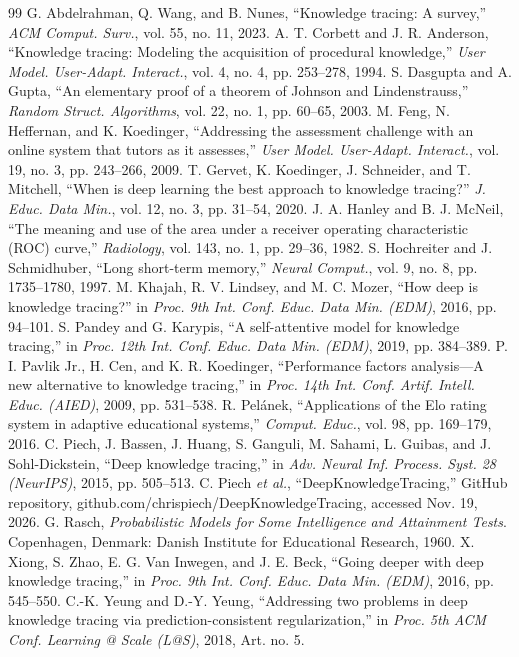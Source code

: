 \documentclass[10pt,twocolumn]{article}
\begin{document}
\renewcommand{\refname}{\normalsize\centering\bfseries АШИГЛАСАН МАТЕРИАЛ, НОМ ЗҮЙ}
\begin{thebibliography}{99}\footnotesize
\setlength{\itemsep}{1pt}
 G. Abdelrahman, Q. Wang, and B. Nunes, “Knowledge tracing: A survey,”
\emph{ACM Comput. Surv.}, vol. 55, no. 11, 2023.
 A. T. Corbett and J. R. Anderson, “Knowledge tracing: Modeling the acquisition of
procedural knowledge,” \emph{User Model. User-Adapt. Interact.}, vol. 4, no. 4, pp. 253--278, 1994.
 S. Dasgupta and A. Gupta, “An elementary proof of a theorem of Johnson and
Lindenstrauss,” \emph{Random Struct. Algorithms}, vol. 22, no. 1, pp. 60--65, 2003.
 M. Feng, N. Heffernan, and K. Koedinger, “Addressing the assessment challenge with
an online system that tutors as it assesses,” \emph{User Model. User-Adapt. Interact.}, vol. 19,
no. 3, pp. 243--266, 2009.
 T. Gervet, K. Koedinger, J. Schneider, and T. Mitchell, “When is deep learning the
best approach to knowledge tracing?” \emph{J. Educ. Data Min.}, vol. 12, no. 3, pp. 31--54, 2020.
 J. A. Hanley and B. J. McNeil, “The meaning and use of the area under a receiver
operating characteristic (ROC) curve,” \emph{Radiology}, vol. 143, no. 1, pp. 29--36, 1982.
 S. Hochreiter and J. Schmidhuber, “Long short-term memory,” \emph{Neural Comput.},
vol. 9, no. 8, pp. 1735--1780, 1997.
 M. Khajah, R. V. Lindsey, and M. C. Mozer, “How deep is knowledge tracing?” in
\emph{Proc. 9th Int. Conf. Educ. Data Min. (EDM)}, 2016, pp. 94--101.
 S. Pandey and G. Karypis, “A self-attentive model for knowledge tracing,” in
\emph{Proc. 12th Int. Conf. Educ. Data Min. (EDM)}, 2019, pp. 384--389.
 P. I. Pavlik Jr., H. Cen, and K. R. Koedinger, “Performance factors analysis---A new
alternative to knowledge tracing,” in \emph{Proc. 14th Int. Conf. Artif. Intell. Educ. (AIED)},
2009, pp. 531--538.
 R. Pelánek, “Applications of the Elo rating system in adaptive educational
systems,” \emph{Comput. Educ.}, vol. 98, pp. 169--179, 2016.
 C. Piech, J. Bassen, J. Huang, S. Ganguli, M. Sahami, L. Guibas, and
J. Sohl-Dickstein, “Deep knowledge tracing,” in \emph{Adv. Neural Inf. Process. Syst. 28
(NeurIPS)}, 2015, pp. 505--513.
 C. Piech \emph{et al.}, “DeepKnowledgeTracing,” GitHub repository,
github.com/chrispiech/DeepKnowledgeTracing, accessed Nov. 19, 2026.
 G. Rasch, \emph{Probabilistic Models for Some Intelligence and Attainment Tests}.
Copenhagen, Denmark: Danish Institute for Educational Research, 1960.
 X. Xiong, S. Zhao, E. G. Van Inwegen, and J. E. Beck, “Going deeper with deep
knowledge tracing,” in \emph{Proc. 9th Int. Conf. Educ. Data Min. (EDM)}, 2016, pp. 545--550.
 C.-K. Yeung and D.-Y. Yeung, “Addressing two problems in deep knowledge tracing
via prediction-consistent regularization,” in \emph{Proc. 5th ACM Conf. Learning @ Scale (L@S)},
2018, Art. no. 5.
\end{thebibliography}
\end{document}
